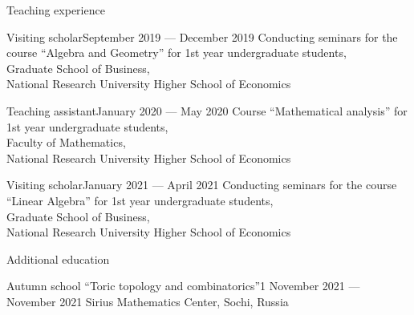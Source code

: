 \documentclass{resume}
\begin{document}
\begin{rSection}{Teaching experience}
  \begin{rSubsection}{Visiting scholar}{September 2019 --- \newline December 2019}{}
    Conducting seminars for the course ``Algebra and Geometry'' for 1st year undergraduate students, \\
    Graduate School of Business, \\
    National Research University Higher School of Economics
  \end{rSubsection}

  \begin{rSubsection}{Teaching assistant}{January 2020 --- \newline May 2020}{}
    Course ``Mathematical analysis'' for 1st year undergraduate students, \\
    Faculty of Mathematics, \\
    National Research University Higher School of Economics
  \end{rSubsection}

  \begin{rSubsection}{Visiting scholar}{January 2021 --- \newline April 2021}{}
    Conducting seminars for the course ``Linear Algebra'' for 1st year undergraduate students, \\
    Graduate School of Business, \\
    National Research University Higher School of Economics
  \end{rSubsection}
\end{rSection}

\begin{rSection}{Additional education}
  \begin{rSubsection}{Autumn school ``Toric topology and combinatorics''}{1 November 2021 ---
       November 2021}{} 
    Sirius Mathematics Center, Sochi, Russia
  \end{rSubsection}
\end{rSection}
\end{document}
